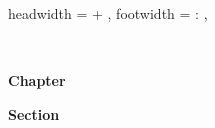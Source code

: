 
\usepackage
[
]
{scrlayer-scrpage} %

\clearpairofpagestyles


\KOMAoptions
{%
    headwidth = \textwidth + \mymarginwidthwithinnersep,%
    footwidth = \myoutermargin : \textwidth,%
}

\renewcommand*{\chaptermarkformat}{\normalfont\sffamily\small\color{footerchaptername}}
\renewcommand*{\sectionmarkformat}{\normalfont\sffamily\small\color{footersectionname}}

\automark*[section]{}


\lehead%
{%
    \begin{minipage}[b]{\mymarginwidth}%
        \small\raggedleft\normalfont\textsf{\textbf{\color{footerchapter}\chaptername\ \thechapter}}
    \end{minipage}
}
\cehead{\hspace*{\mymarginwidthwithinnersep}\parbox{\textwidth}{\raggedright\leftmark}}

\rohead%
{%
    \Ifstr{\rightmark}{\leftmark}%
    {%
        \begin{minipage}[b]{\mymarginwidth}%
            \small\raggedright\normalfont\textsf{\textbf{\color{footersection}Chapter\ \thechapter}}%
        \end{minipage}%
    }%
    {%
        \begin{minipage}[b]{\mymarginwidth}%
            \small\raggedright\normalfont\textsf{\textbf{\color{footersection}Section\ \thesection}}%
        \end{minipage}%
    }%
}
\cohead{\hspace*{-\mymarginwidthwithinnersep}\parbox{\textwidth}{\raggedleft\rightmark}}

